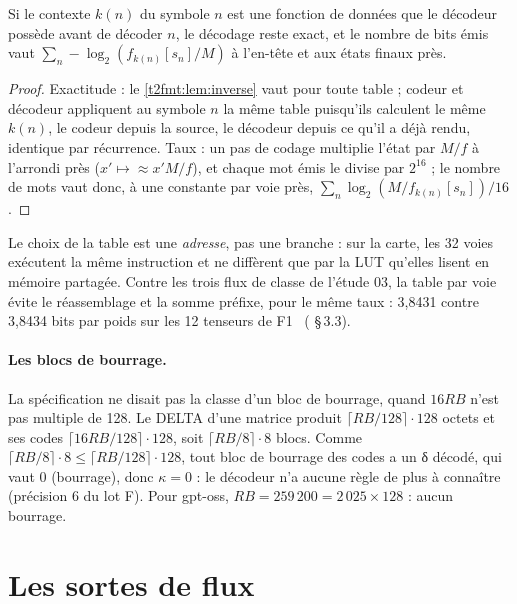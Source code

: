 \begin{proposition}\label{t2fmt:prop:contexte}
Si le contexte $k(n)$ du symbole $n$ est une fonction de données que le décodeur possède avant de décoder $n$, le décodage reste exact, et le nombre de bits émis vaut $\sum_n -\log_2(f_{k(n)}[s_n]/M)$ à l'en-tête et aux états finaux près.
\end{proposition}
\begin{proof}
Exactitude : le \cref{t2fmt:lem:inverse} vaut pour toute table ; codeur et décodeur appliquent au symbole $n$ la même table puisqu'ils calculent le même $k(n)$, le codeur depuis la source, le décodeur depuis ce qu'il a déjà rendu, identique par récurrence. Taux : un pas de codage multiplie l'état par $M/f$ à l'arrondi près ($x' \mapsto \approx x' M/f$), et chaque mot émis le divise par $2^{16}$ ; le nombre de mots vaut donc, à une constante par voie près, $\sum_n \log_2(M/f_{k(n)}[s_n]) / 16$.
\end{proof}

Le choix de la table est une \emph{adresse}, pas une branche : sur la carte, les 32 voies exécutent la même instruction et ne diffèrent que par la LUT qu'elles lisent en mémoire partagée. Contre les trois flux de classe de l'étude 03, la table par voie évite le réassemblage et la somme préfixe, pour le même taux : 3,8431 contre 3,8434 bits par poids sur les 12 tenseurs de F1 \mes~( §\,3.3).

\paragraph{Les blocs de bourrage.} La spécification ne disait pas la classe d'un bloc de bourrage, quand $16RB$ n'est pas multiple de 128. Le DELTA d'une matrice produit $\lceil RB/128 \rceil \cdot 128$ octets et ses codes $\lceil 16RB/128 \rceil \cdot 128$, soit $\lceil RB/8 \rceil \cdot 8$ blocs. Comme $\lceil RB/8 \rceil \cdot 8 \le \lceil RB/128 \rceil \cdot 128$, tout bloc de bourrage des codes a un δ décodé, qui vaut 0 (bourrage), donc $\kappa = 0$ : le décodeur n'a aucune règle de plus à connaître (précision 6 du lot F). Pour gpt-oss, $RB = 259\,200 = 2\,025 \times 128$ : aucun bourrage.

\section{Les sortes de flux}\label{t2fmt:sec:sortes}

